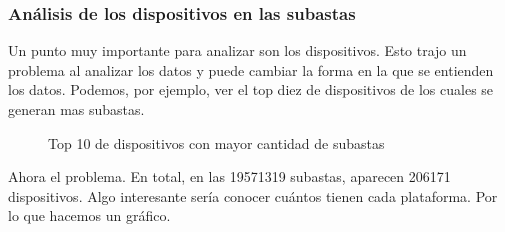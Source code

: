 \documentclass[a4paper, 12pt]{article}
\newcommand\tab[1][1cm]{\hspace*{#1}}
\begin{document}
	\subsubsection{Análisis de los dispositivos en las subastas}
	\tab Un punto muy importante para analizar son los dispositivos. Esto trajo un problema al analizar los datos y puede cambiar la forma en la que se entienden los datos.
	Podemos, por ejemplo, ver el top diez de dispositivos de los cuales se generan mas subastas.
	\FloatBarrier
		\begin{figure}
			\centering
		   	\caption{Top 10 de dispositivos con mayor cantidad de subastas}
			\label{top10devicessubastas}
		\end{figure}
	\FloatBarrier

	\tab Ahora el problema.\newline
	\tab En total, en las 19571319 subastas, aparecen 206171 dispositivos. Algo interesante sería conocer cuántos tienen cada plataforma. Por lo que hacemos un gráfico.
\end{document}
